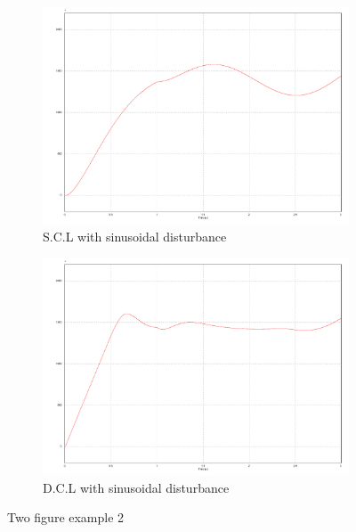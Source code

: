 \documentclass[12pt,english, openany]{book}
\begin{document}
\begin{figure}[h]
	\centering
	\begin{subfigure}{0.49\linewidth} \centering
		\includegraphics[scale=0.25]{Figures/single_sine_perturb}
		\caption{S.C.L with sinusoidal disturbance}\label{fig:figA}
	\end{subfigure}
	\begin{subfigure}{0.49\linewidth} \centering
		\includegraphics[scale=0.25]{Figures/dual_sine_perturb}
		\caption{D.C.L with sinusoidal disturbance}\label{fig:figB}
	\end{subfigure}
	\caption{Two figure example 2} \label{fig:twodisturb}
\end{figure}
\lipsum[5]
\end{document}
